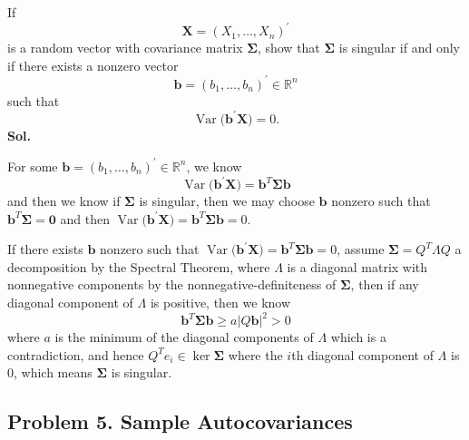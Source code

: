 \documentclass[lang=en,11pt,a4paper,citestyle =authoryear]{elegantpaper}
\begin{document}
If
\[
\mathbf{X}=(X_1,\ldots,X_n)^\prime
\]
is a random vector with covariance matrix $\boldsymbol{\Sigma}$,
show that $\boldsymbol{\Sigma}$ is singular if and only if there
exists a nonzero vector
\[
\mathbf{b}=(b_1,\ldots,b_n)^\prime\in\mathbb{R}^n
\]
such that
\[
\operatorname{Var}\bigl(\mathbf{b}^\prime\mathbf{X}\bigr)=0.
\]
\vspace{0.5em}
\textbf{Sol.} \par
For some $\mathbf{b}=(b_1,\ldots,b_n)^\prime\in\mathbb{R}^n$, we know
\[
\operatorname{Var}\bigl(\mathbf{b}^\prime\mathbf{X}\bigr) = \mathbf{b}^T\boldsymbol{\Sigma}\mathbf{b}
\]
and then we know if $\boldsymbol{\Sigma}$ is singular, then we may choose $\mathbf{b}$ nonzero such that $\mathbf{b}^T\boldsymbol{\Sigma} = \mathbf{0}$ and then $\operatorname{Var}\bigl(\mathbf{b}^\prime\mathbf{X}\bigr) = \mathbf{b}^T\boldsymbol{\Sigma}\mathbf{b} = 0$.\par
If there exists $\mathbf{b}$ nonzero such that $\operatorname{Var}\bigl(\mathbf{b}^\prime\mathbf{X}\bigr) = \mathbf{b}^T\boldsymbol{\Sigma}\mathbf{b} = 0$, assume $\boldsymbol{\Sigma} = Q^T \Lambda Q$ a decomposition by the Spectral Theorem, where $\Lambda$ is a diagonal matrix with nonnegative components by the nonnegative-definiteness of $\boldsymbol{\Sigma}$, then if any diagonal component of $\Lambda$ is positive, then we know
\[
\mathbf{b}^T\boldsymbol{\Sigma}\mathbf{b} \geq a|Q\mathbf{b}|^2 > 0
\]
where $a$ is the minimum of the diagonal components of $\Lambda$ which is a contradiction, and hence $Q^Te_i \in \ker \boldsymbol{\Sigma}$ where the $i$th diagonal component of $\Lambda$ is $0$, which means $\boldsymbol{\Sigma}$ is singular.
\par 
\vspace{0.5em}

\subsection*{Problem 5. Sample Autocovariances} 
\end{document}
